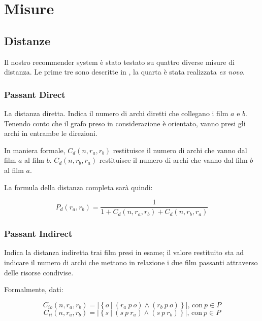 \section{Misure}

\subsection{Distanze}

Il nostro recommender system è stato testato su quattro diverse misure di distanza.
Le prime tre sono descritte in \citet{passant2010measuring}, la quarta è stata realizzata \emph{ex novo}.



\subsubsection{Passant Direct}
La distanza diretta. Indica il numero di archi diretti che collegano i film $a$ e $b$. Tenendo conto che il grafo preso in considerazione è orientato, vanno presi gli archi in entrambe le direzioni.

In maniera formale, $C_d(n,r_a,r_b)$ restituisce il numero di archi che vanno dal film $a$ al film $b$. 
$C_d(n,r_b,r_a)$ restituisce il numero di archi che vanno dal film $b$ al film $a$.

La formula della distanza completa sarà quindi:

    \begin{equation}
        P_{d}(r_{a},r_{b}) = \frac{1} {1+C_{d}(n,r_{a},r_{b})+C_{d}(n,r_{b},r_{a})}
    \end{equation}




\subsubsection{Passant Indirect}

Indica la distanza indiretta trai film presi in esame; il valore restituito sta ad indicare il numero di archi che mettono in relazione i due film passanti attraverso delle risorse condivise.

Formalmente, dati:

$$C_{io}(n,r_a,r_b) = \left\vert \left\{ o \  | \  (r_a \  p \  o ) \wedge (r_b \  p \  o) \right\} \right\vert \text{, con} \ p \in P$$
$$C_{ii}(n,r_a,r_b) = \left\vert \left\{ s \  | \  ( s \  p \  r_a ) \wedge ( s \  p \  r_b) \right\} \right\vert \text{,~con} \  p \in P$$ 

